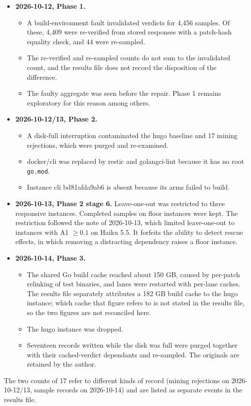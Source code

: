 \documentclass[10pt]{article}
\begin{document}
\begin{itemize}
\item \textbf{2026-10-12, Phase 1.}
  \begin{itemize}
  \item A build-environment fault invalidated verdicts for 4,456 samples. Of these, 4,409 were re-verified from stored responses with a patch-hash equality check, and 44 were re-sampled.
  \item The re-verified and re-sampled counts do not sum to the invalidated count, and the results file does not record the disposition of the difference.
  \item The faulty aggregate was seen before the repair. Phase 1 remains exploratory for this reason among others.
  \end{itemize}
\item \textbf{2026-10-12/13, Phase 2.}
  \begin{itemize}
  \item A disk-full interruption contaminated the hugo baseline and 17 mining rejections, which were purged and re-examined.
  \item docker/cli was replaced by restic and golangci-lint because it has no root \texttt{go.mod}.
  \item Instance cli bd81afda9ab6 is absent because its arms failed to build.
  \end{itemize}
\item \textbf{2026-10-13, Phase 2 stage 6.} Leave-one-out was restricted to three responsive instances. Completed samples on floor instances were kept. The restriction followed the note of 2026-10-13, which limited leave-one-out to instances with A1 $\geq 0.1$ on Haiku 5.5. It forfeits the ability to detect rescue effects, in which removing a distracting dependency raises a floor instance.
\item \textbf{2026-10-14, Phase 3.}
  \begin{itemize}
  \item The shared Go build cache reached about 150 GB, caused by per-patch relinking of test binaries, and lanes were restarted with per-lane caches. The results file separately attributes a 182 GB build cache to the hugo instance; which cache that figure refers to is not stated in the results file, so the two figures are not reconciled here.
  \item The hugo instance was dropped.
  \item Seventeen records written while the disk was full were purged together with their cached-verdict dependants and re-sampled. The originals are retained by the author.
  \end{itemize}
\end{itemize}
The two counts of 17 refer to different kinds of record (mining rejections on 2026-10-12/13, sample records on 2026-10-14) and are listed as separate events in the results file.
\end{document}
